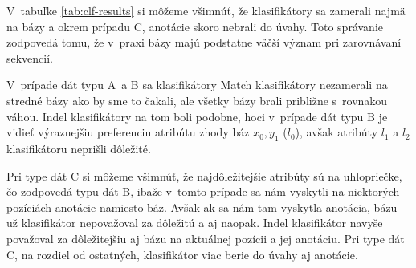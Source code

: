 V~tabuľke \ref{tab:clf-results} si môžeme všimnúť, že klasifikátory sa zamerali najmä na bázy a okrem prípadu C, anotácie skoro nebrali do úvahy.
Toto správanie zodpovedá tomu, že v~praxi bázy majú podstatne väčší význam pri zarovnávaní sekvencií.

V~prípade dát typu A~a B sa klasifikátory Match klasifikátory nezamerali na stredné bázy ako by sme to čakali, ale všetky bázy brali približne s~rovnakou váhou. Indel klasifikátory na tom boli podobne, hoci v~prípade dát typu B je vidieť výraznejšiu preferenciu atribútu zhody báz $x_0, y_1$ ($l_0$), avšak atribúty $l_1$ a $l_2$ klasifikátoru neprišli dôležité.

Pri type dát C si môžeme všimnúť, že najdôležitejšie atribúty sú na uhlopriečke, čo zodpovedá typu dát B, ibaže v~tomto prípade sa nám vyskytli na niektorých pozíciách anotácie namiesto báz.
Avšak ak sa nám tam vyskytla anotácia, bázu už klasifikátor nepovažoval za dôležitú a aj naopak.
Indel klasifikátor navyše považoval za dôležitejšiu aj bázu na aktuálnej pozícii a jej anotáciu. Pri type dát C, na rozdiel od ostatných, klasifikátor viac berie do úvahy aj anotácie.


